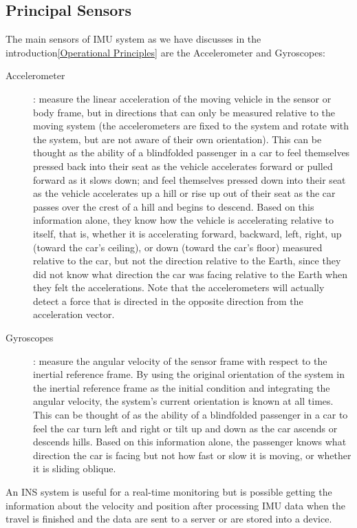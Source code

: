 \documentclass{standalone}
\begin{document}
\subsection{Principal Sensors}\label{Principal Sensors}
The main sensors of IMU system as we have discusses in the introduction\ref{Operational Principles} are the Accelerometer and Gyroscopes:
\begin{description}

\item [Accelerometer]: measure the linear acceleration of the moving vehicle in the sensor or body frame, but in directions that can only be measured relative to the moving system (the accelerometers are fixed to the system and rotate with the system, but are not aware of their own orientation). This can be thought as the ability of a blindfolded passenger in a car to feel themselves pressed back into their seat as the vehicle accelerates forward or pulled forward as it slows down; and feel themselves pressed down into their seat as the vehicle accelerates up a hill or rise up out of their seat as the car passes over the crest of a hill and begins to descend. Based on this information alone, they know how the vehicle is accelerating relative to itself, that is, whether it is accelerating forward, backward, left, right, up (toward the car's ceiling), or down (toward the car's floor) measured relative to the car, but not the direction relative to the Earth, since they did not know what direction the car was facing relative to the Earth when they felt the accelerations.
Note that the accelerometers will actually detect a force that is directed in the opposite direction from the
 acceleration vector. 
\item [Gyroscopes]: measure the angular velocity of the sensor frame with respect to the inertial reference frame. By using the original orientation of the system in the inertial reference frame as the initial condition and integrating the angular velocity, the system's current orientation is known at all times. This can be thought of as the ability of a blindfolded passenger in a car to feel the car turn left and right or tilt up and down as the car ascends or descends hills. Based on this information alone, the passenger knows what direction the car is facing but not how fast or slow it is moving, or whether it is sliding oblique.

\end{description}


\noindent An INS system is useful for a real-time monitoring but is possible getting the information about the velocity and position after processing IMU data when the travel is finished and the data are sent to a server or are stored into a device.
\end{document}
